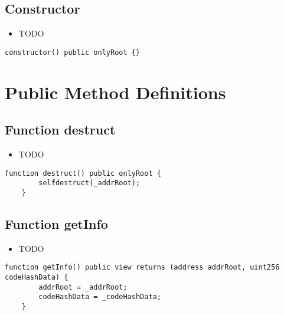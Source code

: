 \subsection{Constructor}

\begin{itemize}
\item TODO
\end{itemize}

\begin{lstlisting}[firstnumber=16]
    constructor() public onlyRoot {}
\end{lstlisting}

\section{Public Method Definitions}


\subsection{Function destruct}

\begin{itemize}
\item TODO
\end{itemize}

\begin{lstlisting}[firstnumber=23]
    function destruct() public onlyRoot {
        selfdestruct(_addrRoot);
    }
\end{lstlisting}

\subsection{Function getInfo}

\begin{itemize}
\item TODO
\end{itemize}

\begin{lstlisting}[firstnumber=18]
    function getInfo() public view returns (address addrRoot, uint256 codeHashData) {
        addrRoot = _addrRoot;
        codeHashData = _codeHashData;
    }
\end{lstlisting}

